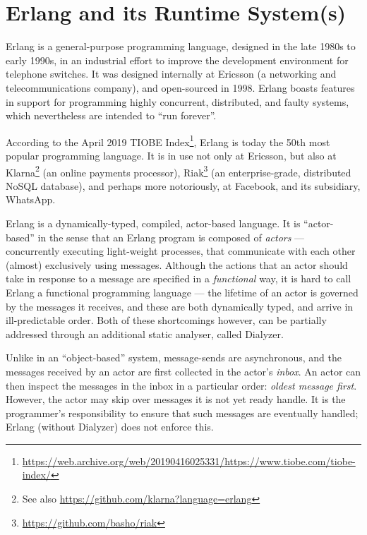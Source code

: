 \chapter{Erlang and its Runtime System(s)}

Erlang is a general-purpose programming language, designed in the late
1980s to early 1990s, in an industrial effort to improve the
development environment for telephone switches\cite{erlang:hopl:2007}.
It was designed internally at Ericsson (a networking and
telecommunications company), and open-sourced in 1998. Erlang boasts
features in support for programming highly concurrent, distributed,
and faulty systems, which nevertheless are intended to ``run
forever''.

According to the April 2019 TIOBE
Index\footnote{\url{https://web.archive.org/web/20190416025331/https://www.tiobe.com/tiobe-index/}},
Erlang is today the 50th most popular programming language. It is in
use not only at Ericsson\cite{media:2018-03-31:Erlang-20-years}, but
also at
Klarna\cite{media:2015-01-09:Klarna-Engineering-Insights}\footnote{See
also \url{https://github.com/klarna?language=erlang}} (an online
payments processor),
Riak\footnote{\url{https://github.com/basho/riak}} (an
enterprise-grade, distributed NoSQL database), and perhaps more
notoriously, at Facebook\cite{media:2008-03-13:facebook-chat}, and its
subsidiary, WhatsApp\cite{media:2014-02-21:Inside-Erlang}.

Erlang is a dynamically-typed, compiled, actor-based
language\cite{erlang:2019:Erlang-OTP}. It is ``actor-based'' in the
sense that an Erlang program is composed of \emph{actors} ---
concurrently executing light-weight processes, that communicate with
each other (almost) exclusively using messages.  Although the actions
that an actor should take in response to a message are specified in a
\emph{functional} way, it is hard to call Erlang a functional
programming language --- the lifetime of an actor is governed by the
messages it receives, and these are both dynamically typed, and arrive
in ill-predictable order. Both of these shortcomings however, can be
partially addressed through an additional static analyser, called
Dialyzer\cite{erlang:2019:Dialyzer}.

Unlike in an ``object-based'' system, message-sends are asynchronous,
and the messages received by an actor are first collected in the
actor's \emph{inbox}. An actor can then inspect the messages in the
inbox in a particular order: \emph{oldest message first}.  However,
the actor may skip over messages it is not yet ready handle.  It is
the programmer's responsibility to ensure that such messages are
eventually handled; Erlang (without Dialyzer) does not enforce this.

